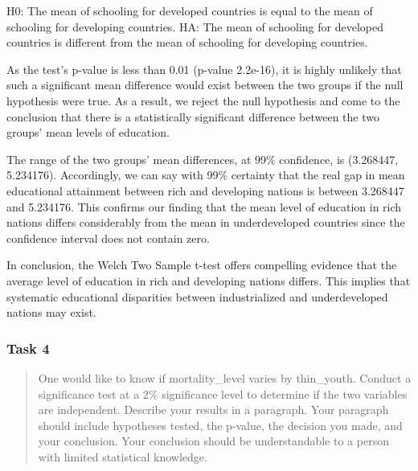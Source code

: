 \documentclass[
]{article}
\newenvironment{Shaded}{\begin{snugshade}}{\end{snugshade}}
\newcommand{\FunctionTok}[1]{\textcolor[rgb]{0.00,0.00,0.00}{#1}}
\newcommand{\NormalTok}[1]{#1}
\newcommand{\OtherTok}[1]{\textcolor[rgb]{0.56,0.35,0.01}{#1}}
\newcommand{\SpecialCharTok}[1]{\textcolor[rgb]{0.00,0.00,0.00}{#1}}
\begin{document}
H0: The mean of schooling for developed countries is equal to the mean
of schooling for developing countries. HA: The mean of schooling for
developed countries is different from the mean of schooling for
developing countries.

As the test's p-value is less than 0.01 (p-value 2.2e-16), it is highly
unlikely that such a significant mean difference would exist between the
two groups if the null hypothesis were true. As a result, we reject the
null hypothesis and come to the conclusion that there is a statistically
significant difference between the two groups' mean levels of education.

The range of the two groups' mean differences, at 99\% confidence, is
(3.268447, 5.234176). Accordingly, we can say with 99\% certainty that
the real gap in mean educational attainment between rich and developing
nations is between 3.268447 and 5.234176. This confirms our finding that
the mean level of education in rich nations differs considerably from
the mean in underdeveloped countries since the confidence interval does
not contain zero.

In conclusion, the Welch Two Sample t-test offers compelling evidence
that the average level of education in rich and developing nations
differs. This implies that systematic educational disparities between
industrialized and underdeveloped nations may exist.

\hypertarget{task-4}{%
\subsubsection{Task 4}\label{task-4}}

\begin{quote}
One would like to know if mortality\_level varies by thin\_youth.
Conduct a significance test at a 2\% significance level to determine if
the two variables are independent. Describe your results in a paragraph.
Your paragraph should include hypotheses tested, the p-value, the
decision you made, and your conclusion. Your conclusion should be
understandable to a person with limited statistical knowledge.
\end{quote}

\begin{Shaded}
\end{Shaded}
\end{document}
